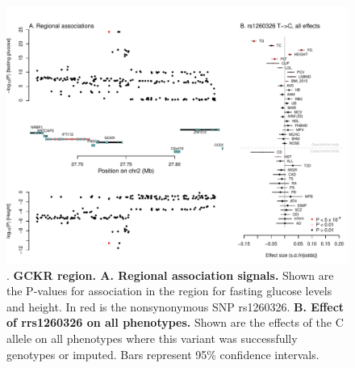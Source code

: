 \documentclass[11pt,titlepage]{article}
\begin{document}
\begin{figure}
\begin{center}
\includegraphics[scale = 0.6]{figs/GCKR_region.pdf}
\caption{. \textbf{GCKR region. A. Regional association signals.}  Shown are the P-values for association in the region for fasting glucose levels and height. In red is the nonsynonymous SNP rs1260326. \textbf{B. Effect of rrs1260326 on all phenotypes.} Shown are the effects of the C allele on all phenotypes where this variant was successfully genotypes or imputed. Bars represent 95\% confidence intervals. }\label{f_gckr}
\end{center}
\end{figure}
\end{document}
